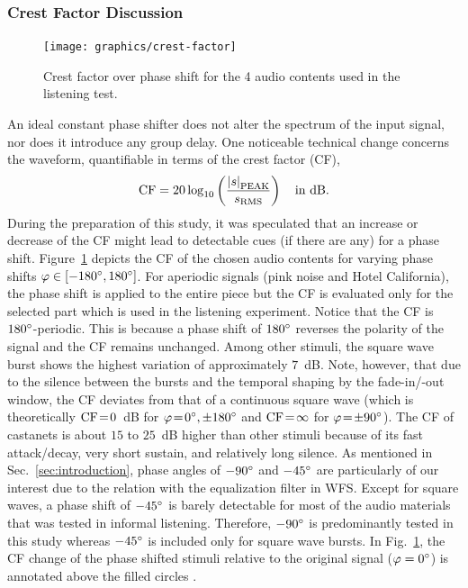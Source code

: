 \subsubsection{Crest Factor Discussion}
%
\begin{figure}[t]
\centering
\texttt{[image: graphics/crest-factor]}
\caption{Crest factor over phase shift for the 4 audio contents used in the
listening test.}
\label{fig:crestfactor}
\end{figure}
%
An ideal constant phase shifter does not alter the
spectrum of the input signal, nor does it introduce any group delay.
One noticeable technical change concerns the waveform, quantifiable in terms of
the crest factor (CF),
\begin{align}
\CF = 20 \log_{10}\left(\frac{\abs{s}_{\text{PEAK}}}{s_{\text{RMS}}}\right)\quad \text{in dB}.
\label{eq:crestfactor}
\end{align}
During the preparation of this study,
it was speculated that an increase or decrease of the CF
might lead to detectable cues (if there are any) for a phase shift.
%
\NewL Figure~\ref{fig:crestfactor} depicts the CF of the chosen audio contents
for varying phase shifts $\varphi \in [-180\degree, 180\degree]$.
For aperiodic signals (pink noise and Hotel California),
the phase shift is applied to the entire piece
but the CF is evaluated only for the selected part
which is used in the listening experiment.
Notice that the CF is $180\degree$-periodic.
This is because a phase shift of $180\degree$ reverses the polarity of the signal
and the CF remains unchanged.
Among other stimuli, the square wave burst shows the highest variation
of approximately $7$~dB.
Note, however, that due to the silence between the bursts
and the temporal shaping by the fade-in/-out window,
the CF deviates from that of a continuous square wave
(which is theoretically $\text{CF}\!=\!0$~dB for $\varphi\!=\!0\degree, \pm180\degree$
and $\text{CF}\!=\!\infty$ for $\varphi\!=\!\pm 90\degree$).
The CF of castanets is about $15$ to $25$~dB higher than other stimuli
because of its fast attack/decay, very short sustain,
and relatively long silence.
%
\NewL As mentioned in Sec.~\ref{sec:introduction},
phase angles of $-90\degree$ and $-45\degree$ are particularly of our interest
due to the relation with the equalization filter in WFS.
Except for square waves, a phase shift of $-45\degree$ is barely detectable
for most of the audio materials that was tested in informal listening.
Therefore, $-90\degree$ is predominantly tested in this study
whereas $-45\degree$ is included only for square wave bursts.
In Fig.~\ref{fig:crestfactor}, the CF change of the phase shifted stimuli
relative to the original signal ($\varphi=0\degree$) is annotated
above the filled circles \cflabel.

